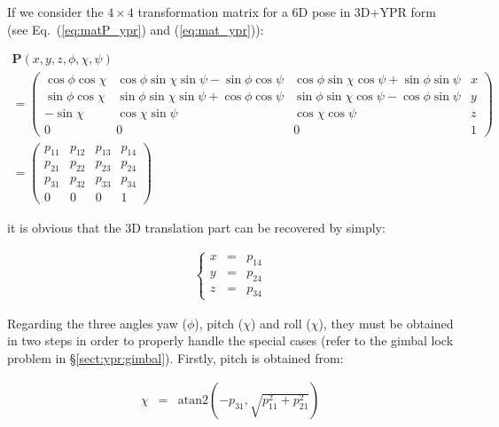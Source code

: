 \documentclass[a4paper,10pt]{report}
\begin{document}
If we consider the $4 \times 4$ transformation matrix for 
a 6D pose in 3D+YPR form (see Eq.~(\ref{eq:matP_ypr}) and (\ref{eq:mat_ypr})):

\begin{equation*}
\begin{array}{l}
\mathbf{P}(x,y,z,\phi,\chi,\psi)  \\
=\left(
  \begin{array}{ccc|c}
   \cos \phi \cos \chi  & \cos \phi \sin \chi \sin \psi - \sin \phi \cos \psi   & \cos \phi \sin \chi \cos \psi + \sin \phi \sin \psi & x \\
   \sin \phi \cos \chi  & \sin \phi \sin \chi \sin \psi + \cos \phi \cos \psi  &  \sin \phi \sin \chi \cos \psi - \cos \phi \sin \psi & y \\
   -\sin \chi & \cos \chi \sin \psi  &  \cos \chi \cos \psi & z \\ \hline
   0 & 0 & 0& 1
  \end{array}
\right) \\
=\left(
  \begin{array}{ccc|c}
   p_{11} & p_{12}& p_{13}& p_{14} \\
   p_{21} & p_{22}& p_{23}& p_{24} \\
   p_{31} & p_{32}& p_{33}& p_{34} \\
   0 & 0 & 0& 1
  \end{array}
\right)
\end{array}
\end{equation*}

\noindent it is obvious that the 3D translation part can be recovered by simply:

\begin{eqnarray*}
 \left\{
  \begin{array}{rcl}
    x &=& p_{14} \\
    y &=& p_{24} \\
    z &=& p_{34} 
  \end{array}
  \right.
\end{eqnarray*}

Regarding the three angles yaw ($\phi$), pitch ($\chi$) and roll ($\chi$), they must be obtained 
in two steps in order to properly handle the special cases 
(refer to the gimbal lock problem in \S \ref{sect:ypr:gimbal}).
Firstly, pitch is obtained from:

\begin{eqnarray}
  \chi &=& \mathrm{atan2} \left( -p_{31} , \sqrt{ p_{11}^2 + p_{21}^2 } \right) 
\end{eqnarray}
\end{document}
